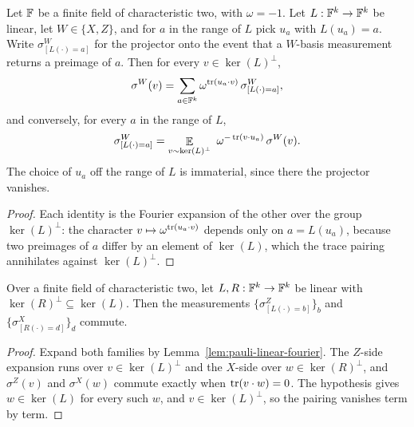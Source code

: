 \begin{lemma}
\label{lem:pauli-linear-fourier}
\leanok
Let $\mathbb{F}$ be a finite field of characteristic two, with $\omega=-1$.
Let $L : \mathbb{F}^k \to \mathbb{F}^k$ be linear, let $W \in \{X, Z\}$, and for $a$ in the range of $L$
pick $u_a$ with $L(u_a) = a$. Write $\sigma^W_{[L(\cdot) = a]}$ for the projector onto the
event that a $W$-basis measurement returns a preimage of $a$. Then for every
$v \in \ker(L)^\perp$,
\begin{equation*}
  \sigma^W(v) = \sum_{a \in \mathbb{F}^k} \omega^{\operatorname{tr}(u_a \cdot v)}\, \sigma^W_{[L(\cdot) = a]},
\end{equation*}
and conversely, for every $a$ in the range of $L$,
\begin{equation*}
  \sigma^W_{[L(\cdot) = a]} = \mathop{\mathbb{E}}_{v \sim \ker(L)^\perp}\ \omega^{-\operatorname{tr}(v \cdot u_a)}\,
    \sigma^W(v).
\end{equation*}
The choice of $u_a$ off the range of $L$ is immaterial, since there the projector vanishes.
\end{lemma}

\begin{proof}
\leanok
Each identity is the Fourier expansion of the other over the group $\ker(L)^\perp$: the
character $v \mapsto \omega^{\operatorname{tr}(u_a \cdot v)}$ depends only on $a = L(u_a)$, because two
preimages of $a$ differ by an element of $\ker(L)$, which the trace pairing annihilates
against $\ker(L)^\perp$.
\end{proof}

\effortEasy

\begin{lemma}
\label{lem:pauli-commute-criterion}
\leanok
Over a finite field of characteristic two, let $L, R : \mathbb{F}^k \to \mathbb{F}^k$ be linear with
$\ker(R)^\perp \subseteq \ker(L)$. Then the
measurements $\{\sigma^Z_{[L(\cdot) = b]}\}_b$ and $\{\sigma^X_{[R(\cdot) = d]}\}_d$ commute.
\end{lemma}

\begin{proof}
\leanok
Expand both families by Lemma~\ref{lem:pauli-linear-fourier}. The $Z$-side expansion runs
over $v \in \ker(L)^\perp$ and the $X$-side over $w \in \ker(R)^\perp$, and
$\sigma^Z(v)$ and $\sigma^X(w)$ commute exactly when $\operatorname{tr}(v \cdot w) = 0$. The
hypothesis gives $w \in \ker(L)$ for every such $w$, and $v \in \ker(L)^\perp$, so the pairing
vanishes term by term.
\end{proof}

